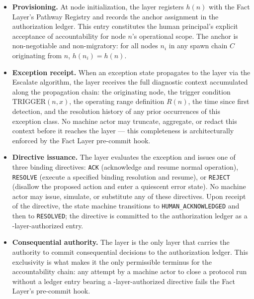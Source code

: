 \begin{itemize}\itemsep=0pt
\item[(\textit{i})] \textbf{Provisioning.} At node initialization, the \purpose{} layer registers $h(n)$ with the Fact Layer's Pathway Registry and records the anchor assignment in the authorization ledger. This entry constitutes the human principal's explicit acceptance of accountability for node $n$'s operational scope. The anchor is non-negotiable and non-migratory: for all nodes $n_i$ in any spawn chain $C$ originating from $n$, $h(n_i) = h(n)$.

\item[(\textit{ii})] \textbf{Exception receipt.} When an exception state propagates to the \purpose{} layer via the Escalate algorithm, the \purpose{} layer receives the full diagnostic context accumulated along the propagation chain: the originating node, the trigger condition $\text{TRIGGER}(n, x)$, the operating range definition $R(n)$, the time since first detection, and the resolution history of any prior occurrences of this exception class. No machine actor may truncate, aggregate, or redact this context before it reaches the \purpose{} layer --- this completeness is architecturally enforced by the Fact Layer pre-commit hook.

\item[(\textit{iii})] \textbf{Directive issuance.} The \purpose{} layer evaluates the exception and issues one of three binding directives: \texttt{ACK} (acknowledge and resume normal operation), \texttt{RESOLVE} (execute a specified binding resolution and resume), or \texttt{REJECT} (disallow the proposed action and enter a quiescent error state). No machine actor may issue, simulate, or substitute any of these directives. Upon receipt of the directive, the state machine transitions to \texttt{HUMAN\_ACKNOWLEDGED} and then to \texttt{RESOLVED}; the directive is committed to the authorization ledger as a \purpose-layer-authorized entry.

\item[(\textit{iv})] \textbf{Consequential authority.} The \purpose{} layer is the only layer that carries the authority to commit consequential decisions to the authorization ledger. This exclusivity is what makes it the only permissible terminus for the accountability chain: any attempt by a machine actor to close a protocol run without a ledger entry bearing a \purpose-layer-authorized directive fails the Fact Layer's pre-commit hook.
\end{itemize}

